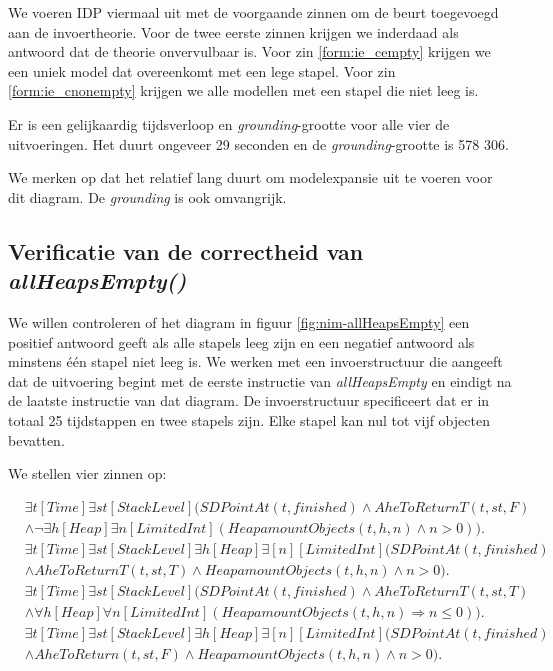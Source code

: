 We voeren IDP viermaal uit met de voorgaande zinnen om de beurt toegevoegd aan de invoertheorie. Voor de twee eerste zinnen krijgen we inderdaad als antwoord dat de theorie onvervulbaar is. Voor zin \ref{form:ie_cempty} krijgen we een uniek model dat overeenkomt met een lege stapel. Voor zin \ref{form:ie_cnonempty} krijgen we alle modellen met een stapel die niet leeg is.

Er is een gelijkaardig tijdsverloop en \textit{grounding}-grootte voor alle vier de uitvoeringen. Het duurt ongeveer 29 seconden en de \textit{grounding}-grootte is 578 306.

We merken op dat het relatief lang duurt om modelexpansie uit te voeren voor dit diagram. De \textit{grounding} is ook omvangrijk.

\subsection{Verificatie van de correctheid van \textit{allHeapsEmpty()}}\label{sec:verify-ahe}

We willen controleren of het diagram in figuur \ref{fig:nim-allHeapsEmpty} een positief antwoord geeft als alle stapels leeg zijn en een negatief antwoord als minstens \'e\'en stapel niet leeg is. We werken met een invoerstructuur die aangeeft dat de uitvoering begint met de eerste instructie van \textit{allHeapsEmpty} en eindigt na de laatste instructie van dat diagram. De invoerstructuur specificeert dat er in totaal 25 tijdstappen en twee stapels zijn. Elke stapel kan nul tot vijf objecten bevatten.

We stellen vier zinnen op:

\begin{align}
	\nonumber&\exists{t}[Time]\exists{st}[StackLevel](SDPointAt(t, finished) \land AheToReturnT(t, st, F) \\ &\land \lnot\exists{h}[Heap]\exists{n}[LimitedInt](HeapamountObjects(t, h, n) \land n > 0)).\label{form:ahe_fnonempty} \\
	\nonumber&\exists{t}[Time]\exists{st}[StackLevel]\exists{h}[Heap]\exists[n][LimitedInt](SDPointAt(t, finished) \\ &\land AheToReturnT(t, st, T) \land HeapamountObjects(t, h, n) \land n > 0).\label{form:ahe_fempty} \\
	\nonumber&\exists{t}[Time]\exists{st}[StackLevel](SDPointAt(t, finished) \land AheToReturnT(t, st, T) \\ &\land \forall{h}[Heap]\forall{n}[LimitedInt](HeapamountObjects(t, h, n) \Rightarrow n \leq 0)).\label{form:ahe_cempty} \\
	\nonumber&\exists{t}[Time]\exists{st}[StackLevel]\exists{h}[Heap]\exists[n][LimitedInt](SDPointAt(t, finished) \\ &\land AheToReturn(t, st, F) \land HeapamountObjects(t, h, n) \land n > 0).\label{form:ahe_cnonempty}
\end{align}

